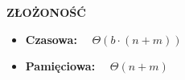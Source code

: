 \documentclass[advanced-sorts.tex]{subfiles}
\begin{document}
    \textbf{ZŁOŻONOŚĆ}
    \begin{itemize}
        \item \textbf{Czasowa:} ~~$\Theta(b \cdot (n + m))$
        \item \textbf{Pamięciowa:} ~~$\Theta(n + m)$
    \end{itemize}



\end{document}
